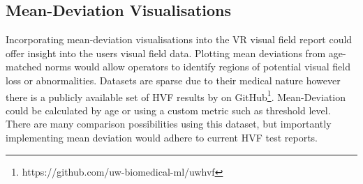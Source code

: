 \documentclass{l4proj}
\begin{document}
\subsection{Mean-Deviation Visualisations}
Incorporating mean-deviation visualisations into the VR visual field report could offer insight into the users visual field data. Plotting mean deviations from age-matched norms would allow operators to identify regions of potential visual field loss or abnormalities. Datasets are sparse due to their medical nature however there is a publicly available set of HVF results by \cite{montesano2022uwhvf} on GitHub\footnote{https://github.com/uw-biomedical-ml/uwhvf}. Mean-Deviation could be calculated by age or using a custom metric such as threshold level. There are many comparison possibilities using this dataset, but importantly implementing mean deviation would adhere to current HVF test reports.


%
% 
\end{document}

